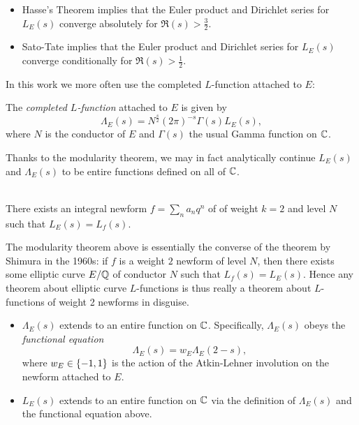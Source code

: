 \documentclass[10pt]{article}
\newcommand{\Les}{L_E(s)}
\newcommand{\Lams}{\Lambda_E(s)}
\begin{document}
\begin{corollary} \mbox{}
\begin{itemize}
\item Hasse's Theorem implies that the Euler product and Dirichlet series for $\Les$ converge absolutely for $\Re(s) > \frac{3}{2}$.
\item Sato-Tate implies that the Euler product and Dirichlet series for $\Les$ converge conditionally for $\Re(s) > \frac{1}{2}$.
\end{itemize}
\end{corollary}

In this work we more often use the completed $L$-function attached to $E$:
\begin{definition}
The {\it completed $L$-function} attached to $E$ is given by
\begin{equation}
\Lambda_E(s) = N^{\frac{s}{2}}(2\pi)^{-s}\Gamma(s)\Les,
\end{equation}
where $N$ is the conductor of $E$ and $\Gamma(s)$ the usual Gamma function on $\mathbb{C}$.
\end{definition}

Thanks to the modularity theorem, we may in fact analytically continue $\Les$ and $\Lams$ to be entire functions defined on all of $\mathbb{C}$.
\begin{theorem} \mbox{}\\
There exists an integral newform $f = \sum_n a_n q^n$ of of weight $k=2$ and level $N$ such that $\Les = L_f(s)$.
\end{theorem}

The modularity theorem above is essentially the converse of the theorem by Shimura in the 1960s: if $f$ is a weight $2$ newform of level $N$, then there exists some elliptic curve $E/\mathbb{Q}$ of conductor $N$ such that $L_f(s) = L_E(s)$. Hence any theorem about elliptic curve $L$-functions is thus really a theorem about $L$-functions of weight 2 newforms in disguise. \\

\begin{corollary} \mbox{}
\begin{itemize}
\item $\Lams$ extends to an entire function on $\mathbb{C}$. Specifically, $\Lams$ obeys the {\it functional equation}
\begin{equation}
\Lams = w_E \Lambda_E(2-s),
\end{equation}
where $w_E \in \left\{-1, 1\right\}$ is the action of the Atkin-Lehner involution on the newform attached to $E$.
\item $\Les$ extends to an entire function on $\mathbb{C}$ via the definition of $\Lams$ and the functional equation above.
\end{itemize}
\end{corollary}
\end{document}
